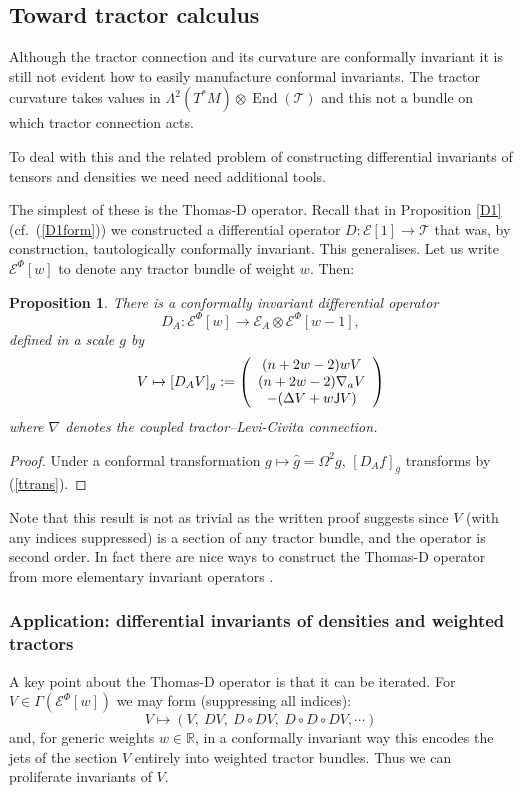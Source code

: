 \documentclass[a4paper,12pt]{amsart}
\def\Cal{\mathcal}
\newcommand{\J}{\mbox{\sf J}}
\newcommand{\ce}{{\Cal E}}
\newcommand{\cT}{{\mathcal T}}
\newcommand{\End}{\operatorname{End}}
\newtheorem{proposition}[theorem]{Proposition}
\theoremstyle{remark}
\newcommand{\nn}[1]{(\ref{#1})}
\begin{document}
\subsection{Toward tractor calculus} \label{trc}
Although the tractor connection and its curvature are conformally
invariant it is still not evident how to easily manufacture conformal
invariants. The tractor curvature takes values in
$\Lambda^2(T^*M)\otimes \End(\cT)$ and this not a bundle on which
tractor connection acts. 

To deal with this and the related problem of constructing differential
invariants of tensors and densities we need need additional tools.

The simplest of these is the Thomas-D operator. Recall that in
Proposition \ref{D1} (cf.\ \nn{D1form}) we constructed a differential
operator $D:\ce[1]\to \cT$ that was, by construction, tautologically
conformally invariant. This generalises. Let us write $\ce^\Phi[w]$ to
denote any tractor bundle of weight $w$. Then:
\begin{proposition}\label{Def}
There is a conformally invariant differential operator 
$$
D_A: \ce^\Phi[w]\to \ce_A\otimes \ce^\Phi[w-1],
$$
defined in a scale $g$ by
$$
 V \mapsto [D_A V]_g:= \left(\begin{array}{c}
(n+2w-2)w V \\
(n+2w-2) \nabla_a V \\
- (\Delta V + w \J V)
\end{array}\right)
$$
where $\nabla$ denotes the coupled tractor--Levi-Civita connection.
\end{proposition}
\begin{proof} Under a conformal transformation 
$g\mapsto \widehat{g}=\Omega^{2}g$,
$[D_A f]_g$ transforms by \nn{ttrans}.
\end{proof}
\noindent Note that this result is not as trivial as the written proof
suggests since $V$ (with any indices suppressed) is a section of any
tractor bundle, and the operator is second order. In fact there are
nice ways to construct the Thomas-D operator from more elementary
invariant operators \cite{CGTracBund,Go-srni1}.



\subsubsection{Application: differential  invariants of densities and weighted tractors } \label{appSec}
A key point about the Thomas-D operator is that it can be iterated. For $V\in \Gamma(\ce^\Phi[w])$ we may form (suppressing all indices):
$$
V\mapsto (V,~D V,~D\circ D V, ~D\circ D\circ D V, \cdots )
$$ and, for generic weights $w\in \mathbb{R}$, in a conformally
invariant way this encodes the jets of the section $V$ entirely into
weighted tractor bundles. Thus we can proliferate invariants of $V$. 
\end{document}

